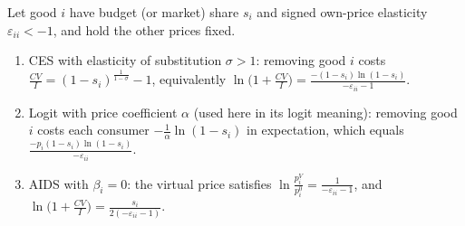 \begin{proposition}\label{prop:05-variety}
Let good $i$ have budget (or market) share $s_i$ and signed own-price elasticity $\varepsilon_{ii} < -1$, and
hold the other prices fixed.
\begin{enumerate}[label=(\alph*)]
  \item CES with elasticity of substitution $\sigma > 1$: removing good $i$ costs
  $\frac{CV}{I} = (1 - s_i)^{\frac{1}{1-\sigma}} - 1$, equivalently
  $\ln\bigl(1 + \frac{CV}{I}\bigr) = \frac{-(1 - s_i)\ln(1 - s_i)}{-\varepsilon_{ii} - 1}$.
  \item Logit with price coefficient $\alpha$ (used here in its logit meaning): removing good $i$ costs each
  consumer $-\frac{1}{\alpha}\ln(1 - s_i)$ in expectation, which equals $\frac{-p_i(1 - s_i)\ln(1 - s_i)}{-\varepsilon_{ii}}$.
  \item AIDS with $\beta_i = 0$: the virtual price satisfies $\ln\frac{p_i^V}{p_i^0} = \frac{1}{-\varepsilon_{ii} - 1}$,
  and $\ln\bigl(1 + \frac{CV}{I}\bigr) = \frac{s_i}{2(-\varepsilon_{ii} - 1)}$.
\end{enumerate}
\end{proposition}

